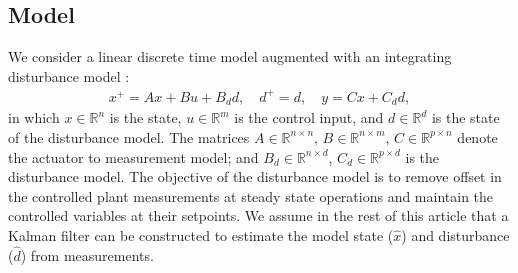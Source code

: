 \documentclass[preprint,5p, twocolumn, authoryear]{elsarticle}
\newcommand{\bbR}{\mathbb{R}}
\newcommand{\xhat}{\hat{x}}
\newcommand{\dhat}{\hat{d}}
\begin{document}
\subsection{Model}
We consider a linear discrete time model augmented with an integrating
disturbance model \citep{pannocchia:rawlings:2003}:
\begin{align}\label{eq:ltimodel}
    x^+ = Ax + Bu + B_dd, \quad d^+ = d, \quad y = Cx + C_dd,
\end{align}
in which $x \in \bbR^n$ is the state, $u \in \bbR^m$ is the control input, and
$d \in \bbR^d$ is the state of the disturbance model. The matrices $A \in
\bbR^{n \times n}$, $B \in \bbR^{n \times m}$,  
$C \in \bbR^{p \times n}$ denote the actuator to measurement model; and $B_d \in
\bbR^{n \times d}$, $C_d \in \bbR^{p \times d}$ is the disturbance model. The
objective of the disturbance model is to remove offset in the controlled plant
measurements at steady state operations and maintain the controlled variables at
their setpoints. We assume in the rest of this article that a Kalman filter can
be constructed to estimate the model state ($\xhat$) and disturbance ($\dhat$)
from measurements. 
\end{document}
